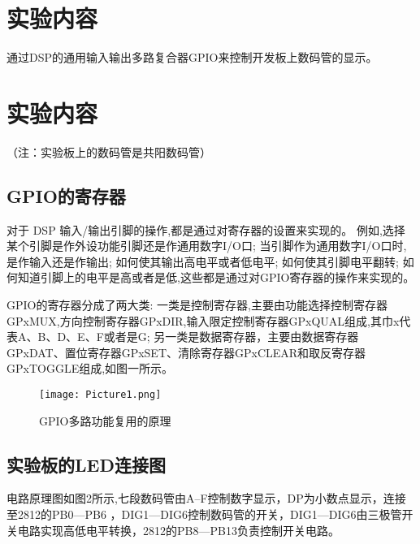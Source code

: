 \documentclass{math201}
\begin{document}

\makecover


\section{实验内容}

通过DSP的通用输入输出多路复合器GPIO来控制开发板上数码管的显示。

\section{实验内容}

（注：实验板上的数码管是共阳数码管）

\subsection{GPIO的寄存器}

对于 DSP 输入/输出引脚的操作,都是通过对寄存器的设置来实现的。
例如,选择某个引脚是作外设功能引脚还是作通用数字I/O口;
当引脚作为通用数字I/O口时,是作输入还是作输出;
如何使其输出高电平或者低电平;
如何使其引脚电平翻转;
如何知道引脚上的电平是高或者是低,这些都是通过对GPIO寄存器的操作来实现的。

GPIO的寄存器分成了两大类:
一类是控制寄存器,主要由功能选择控制寄存器GPxMUX,方向控制寄存器GPxDIR,输入限定控制寄存器GPxQUAL组成,其巾x代表A、B、D、E、F或者是G;
另一类是数据寄存器，主要由数据寄存器GPxDAT、置位寄存器GPxSET、清除寄存器GPxCLEAR和取反寄存器GPxTOGGLE组成,如图一所示。

\begin{figure}[H]  
    \centering\texttt{[image: Picture1.png]}  
    \caption{GPIO多路功能复用的原理}     
    \label{img01}   
\end{figure}

\subsection{实验板的LED连接图}

电路原理图如图2所示,七段数码管由A--F控制数字显示，DP为小数点显示，连接至2812的PB0---PB6 ，DIG1---DIG6控制数码管的开关，DIG1---DIG6由三极管开关电路实现高低电平转换，2812的PB8---PB13负责控制开关电路。
\end{document}
